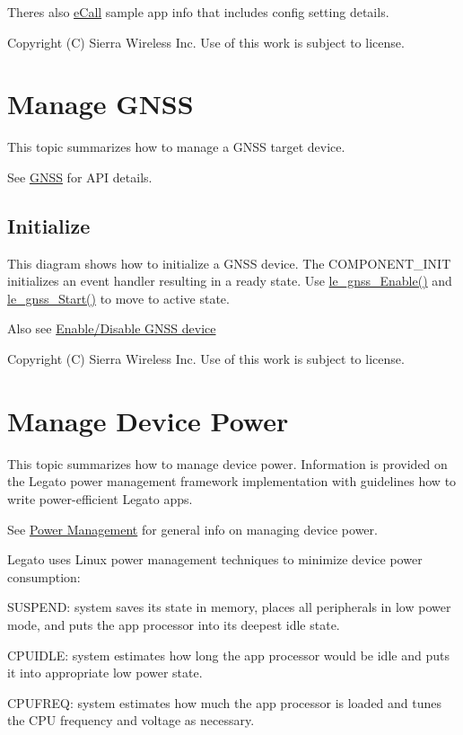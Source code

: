 There\textquotesingle{}s also \hyperlink{sampleApps_eCall}{e\+Call} sample app info that includes config setting details.





Copyright (C) Sierra Wireless Inc. Use of this work is subject to license. \hypertarget{howToGNSS}{}\section{Manage G\+N\+S\+S}\label{howToGNSS}
This topic summarizes how to manage a G\+N\+S\+S target device.

See \hyperlink{c_gnss}{G\+N\+S\+S} for A\+P\+I details.\hypertarget{how_to_g_n_s_s_howToGNSS_initialize}{}\subsection{Initialize}\label{how_to_g_n_s_s_howToGNSS_initialize}
This diagram shows how to initialize a G\+N\+S\+S device. The C\+O\+M\+P\+O\+N\+E\+N\+T\+\_\+\+I\+N\+I\+T initializes an event handler resulting in a ready state. Use \hyperlink{le__gnss__interface_8h_a8e1d96b1b64055b298a74cad1acfbbf8}{le\+\_\+gnss\+\_\+\+Enable()} and \hyperlink{le__gnss__interface_8h_add90639835a531c4b9d15554e4f3ba16}{le\+\_\+gnss\+\_\+\+Start()} to move to active state.



Also see \hyperlink{c_gnss_le_gnss_EnableDisable}{Enable/\+Disable G\+N\+S\+S device}





Copyright (C) Sierra Wireless Inc. Use of this work is subject to license. \hypertarget{howToPowerMgmt}{}\section{Manage Device Power}\label{howToPowerMgmt}
This topic summarizes how to manage device power. Information is provided on the Legato power management framework implementation with guidelines how to write power-\/efficient Legato apps.

See \hyperlink{basicPwrMgmt}{Power Management} for general info on managing device power.

Legato uses Linux power management techniques to minimize device power consumption\+:


\begin{DoxyItemize}
\item S\+U\+S\+P\+E\+N\+D\+: system saves its state in memory, places all peripherals in low power mode, and puts the app processor into its deepest idle state.
\item C\+P\+U\+I\+D\+L\+E\+: system estimates how long the app processor would be idle and puts it into appropriate low power state.
\item C\+P\+U\+F\+R\+E\+Q\+: system estimates how much the app processor is loaded and tunes the C\+P\+U frequency and voltage as necessary.
\end{DoxyItemize}


